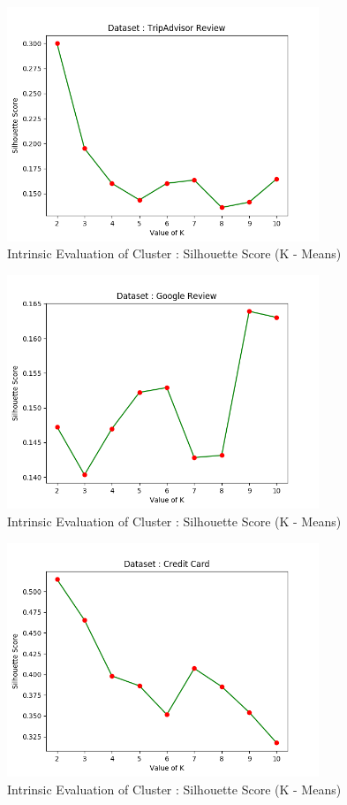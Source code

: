 \documentclass[12pt]{article}
\begin{document}
\begin{figure}[H]
	\centering
	\includegraphics[width = 0.75\linewidth, height = 7cm]{eval_triadv.png}
	\caption{Intrinsic Evaluation of Cluster : Silhouette Score (K - Means)}
	\label{fig:eval_trip}
\end{figure}

\begin{figure}[H]
	\centering
	\includegraphics[width = 0.75\linewidth, height = 7cm]{eval_google.png}
	\caption{Intrinsic Evaluation of Cluster : Silhouette Score (K - Means)}
	\label{fig:eval_g}
\end{figure}


\begin{figure}[H]
	\centering
	\includegraphics[width = 0.75\linewidth, height = 7cm]{eval_credit.png}
	\caption{Intrinsic Evaluation of Cluster : Silhouette Score (K - Means)}
	\label{fig:eval_credit}
\end{figure}
\end{document}
